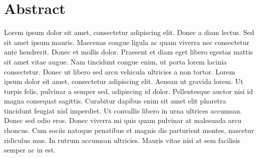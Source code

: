 
\section*{Abstract}

Lorem ipsum dolor sit amet, consectetur adipiscing elit. Donec a diam lectus. Sed sit amet ipsum mauris. Maecenas
congue ligula ac quam viverra nec consectetur ante hendrerit. Donec et mollis dolor. Praesent et diam eget libero
egestas mattis sit amet vitae augue. Nam tincidunt congue enim, ut porta lorem lacinia consectetur. Donec ut libero sed
arcu vehicula ultricies a non tortor. Lorem ipsum dolor sit amet, consectetur adipiscing elit. Aenean ut gravida lorem.
Ut turpis felis, pulvinar a semper sed, adipiscing id dolor. Pellentesque auctor nisi id magna consequat sagittis.
Curabitur dapibus enim sit amet elit pharetra tincidunt feugiat nisl imperdiet. Ut convallis libero in urna ultrices
accumsan. Donec sed odio eros. Donec viverra mi quis quam pulvinar at malesuada arcu rhoncus. Cum sociis natoque
penatibus et magnis dis parturient montes, nascetur ridiculus mus. In rutrum accumsan ultricies. Mauris vitae nisi at
sem facilisis semper ac in est. 